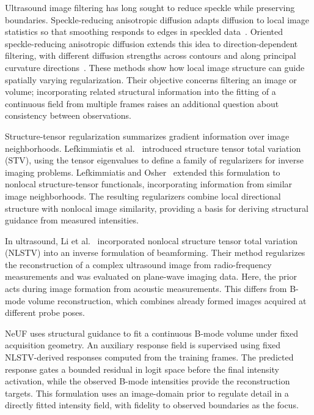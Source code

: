 Ultrasound image filtering has long sought to reduce speckle while preserving boundaries. Speckle-reducing anisotropic diffusion adapts diffusion to local image statistics so that smoothing responds to edges in speckled data~\cite{yu2002srad}. Oriented speckle-reducing anisotropic diffusion extends this idea to direction-dependent filtering, with different diffusion strengths across contours and along principal curvature directions~\cite{krissian2007osrad}. These methods show how local image structure can guide spatially varying regularization. Their objective concerns filtering an image or volume; incorporating related structural information into the fitting of a continuous field from multiple frames raises an additional question about consistency between observations.

Structure-tensor regularization summarizes gradient information over image neighborhoods. Lefkimmiatis et al.~\cite{lefkimmiatis2015stv} introduced structure tensor total variation (STV), using the tensor eigenvalues to define a family of regularizers for inverse imaging problems. Lefkimmiatis and Osher~\cite{lefkimmiatis2015nonlocal} extended this formulation to nonlocal structure-tensor functionals, incorporating information from similar image neighborhoods. The resulting regularizers combine local directional structure with nonlocal image similarity, providing a basis for deriving structural guidance from measured intensities.

In ultrasound, Li et al.~\cite{li2026ipbnlstv} incorporated nonlocal structure tensor total variation (NLSTV) into an inverse formulation of beamforming. Their method regularizes the reconstruction of a complex ultrasound image from radio-frequency measurements and was evaluated on plane-wave imaging data. Here, the prior acts during image formation from acoustic measurements. This differs from B-mode volume reconstruction, which combines already formed images acquired at different probe poses.

NeUF uses structural guidance to fit a continuous B-mode volume under fixed acquisition geometry. An auxiliary response field is supervised using fixed NLSTV-derived responses computed from the training frames. The predicted response gates a bounded residual in logit space before the final intensity activation, while the observed B-mode intensities provide the reconstruction targets. This formulation uses an image-domain prior to regulate detail in a directly fitted intensity field, with fidelity to observed boundaries as the focus.
